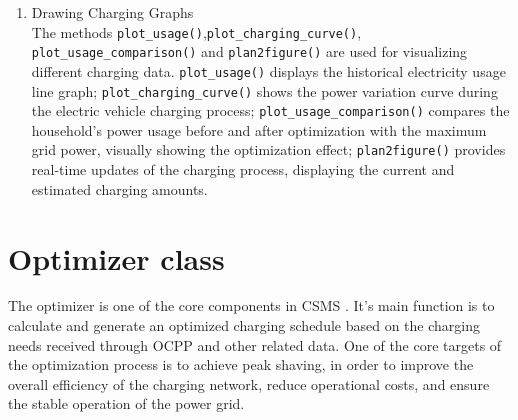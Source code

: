 \documentclass[
	english,
	ruledheaders=section,%
	class=report,%
	thesis={type=Report},%
	accentcolor=9c,%
	custommargins=true,%
	marginpar=false,%
	parskip=half-,%
	fontsize=11pt,%
	logofile={img/tuda_logo.pdf}, %
]{tudapub}
\begin{document}
\begin{enumerate}
    

    \item Drawing Charging Graphs\\
    The methods \texttt{plot\_usage()},\texttt{plot\_charging\_curve()},\\\texttt{plot\_usage\_comparison()} and \texttt{plan2figure()} are used for visualizing different charging data. \texttt{plot\_usage()} displays the historical electricity usage line graph; \texttt{plot\_charging\_curve()} shows the power variation curve during the electric vehicle charging process; \texttt{plot\_usage\_comparison()} compares the household's power usage before and after optimization with the maximum grid power, visually showing the optimization effect; \texttt{plan2figure()} provides real-time updates of the charging process, displaying the current and estimated charging amounts.


\end{enumerate}

\section{Optimizer class}
\label{sec:Optimizer}

The optimizer is one of the core components in \ac{CSMS} . It's main function is to calculate and generate an optimized charging schedule based on the charging needs received through \ac{OCPP} and other related data. One of the core targets of the optimization process is to achieve peak shaving, in order to improve the overall efficiency of the charging network, reduce operational costs, and ensure the stable operation of the power grid.
\end{document}
